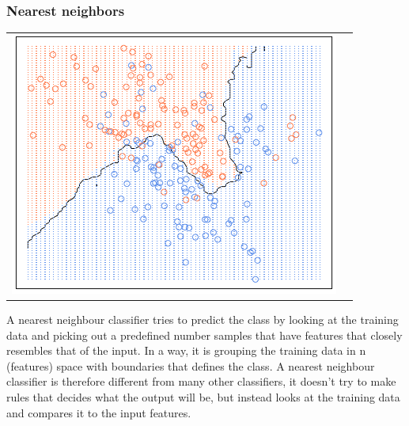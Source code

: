 \documentclass[12pt]{article}
\begin{document}
\subsubsection{Nearest neighbors}
\begin{center}
\begin{tabular}{cc}
\includegraphics[scale = 0.5]{knn.png}
\end{tabular}
\end{center}
A nearest neighbour classifier tries to predict the class by looking at the training data and picking out a predefined number samples that have \newline features that closely resembles that of the input. In a way, it is grouping the training data in n (features) space with boundaries that defines the class. A nearest neighbour classifier is therefore different from many other classifiers, it doesn’t try to make rules that decides what the output will be, but instead looks at the training data and compares it to the input features.
\end{document}
